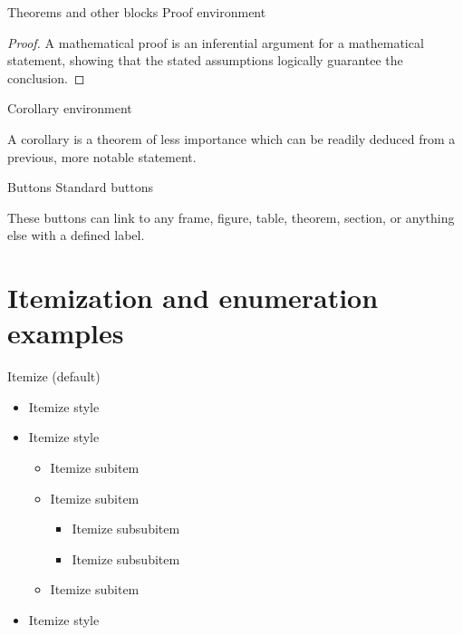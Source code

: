 \documentclass[10pt,t]{beamer}
\begin{document}
\begin{frame}{Theorems and other blocks}
Proof environment
	\begin{proof}
	A mathematical proof is an inferential argument for a mathematical statement, showing that the stated assumptions logically guarantee the conclusion.
	\end{proof}
	
\vspace{11pt}	
Corollary environment
	\begin{corollary}
	A corollary is a theorem of less importance which can be readily deduced from a previous, more notable statement.
	\end{corollary}

\end{frame}






\begin{frame}{Buttons}
Standard buttons

	\hyperlink{colorpalette}{}


	\hyperlink{colorpalette}{\beamerreturnbutton{}}

\vspace{11pt}
These buttons can link to any frame, figure, table, theorem, section, or anything else with a defined label.
\end{frame}




\section{Itemization and enumeration examples} \label{sec:items}
\begin{frame}{Itemize}
(default)
\begin{itemize}
	\item Itemize style
	\item Itemize style
	\begin{itemize}
		\item Itemize subitem 
		\item Itemize subitem
			\begin{itemize}
				\item Itemize subsubitem
				\item Itemize subsubitem
			\end{itemize}
		\item Itemize subitem	
	\end{itemize}
	\item Itemize style
\end{itemize}
\end{frame}
\end{document}
